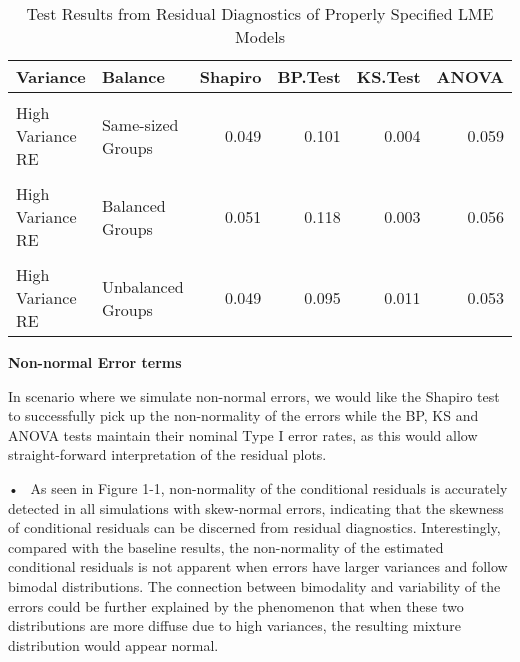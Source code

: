\documentclass[12pt]{article}
\begin{document}
\vspace{-8pt}

\begin{table}[H]

\caption{\label{tab:good_result_table}Test Results from Residual Diagnostics of Properly Specified LME Models}
\centering
\fontsize{8}{10}\selectfont
\begin{tabular}[t]{llrrrr}
\toprule
Variance & Balance & Shapiro & BP.Test & KS.Test & ANOVA\\
\midrule
\cellcolor{gray!6}{High Variance Error} & \cellcolor{gray!6}{Same-sized Groups} & \cellcolor{gray!6}{0.045} & \cellcolor{gray!6}{0.100} & \cellcolor{gray!6}{0.104} & \cellcolor{gray!6}{0.046}\\
High Variance RE & Same-sized Groups & 0.049 & 0.101 & 0.004 & 0.059\\
\cellcolor{gray!6}{High Variance Error} & \cellcolor{gray!6}{Balanced Groups} & \cellcolor{gray!6}{0.053} & \cellcolor{gray!6}{0.098} & \cellcolor{gray!6}{0.085} & \cellcolor{gray!6}{0.050}\\
High Variance RE & Balanced Groups & 0.051 & 0.118 & 0.003 & 0.056\\
\cellcolor{gray!6}{High Variance Error} & \cellcolor{gray!6}{Unbalanced Groups} & \cellcolor{gray!6}{0.059} & \cellcolor{gray!6}{0.102} & \cellcolor{gray!6}{0.079} & \cellcolor{gray!6}{0.041}\\
\addlinespace
High Variance RE & Unbalanced Groups & 0.049 & 0.095 & 0.011 & 0.053\\
\bottomrule
\end{tabular}
\end{table}

\vspace{-7pt}

\textbf{Non-normal Error terms}

In scenario where we simulate non-normal errors, we would like the
Shapiro test to successfully pick up the non-normality of the errors
while the BP, KS and ANOVA tests maintain their nominal Type I error
rates, as this would allow straight-forward interpretation of the
residual plots.

• ~As seen in Figure 1-1, non-normality of the conditional residuals is
accurately detected in all simulations with skew-normal errors,
indicating that the skewness of conditional residuals can be discerned
from residual diagnostics. Interestingly, compared with the baseline
results, the non-normality of the estimated conditional residuals is not
apparent when errors have larger variances and follow bimodal
distributions. The connection between bimodality and variability of the
errors could be further explained by the phenomenon that when these two
distributions are more diffuse due to high variances, the resulting
mixture distribution would appear normal.
\end{document}
